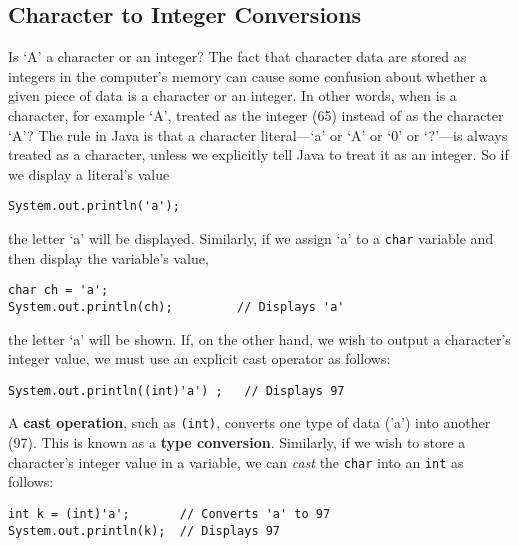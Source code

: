 \subsection{Character to Integer Conversions}

\noindent Is `A' a character or an integer?  The fact that character data are
stored as integers in the computer's memory can cause some confusion
about whether a given piece of data is a character or an integer.  In
other words, when is a character, for example `A', treated as the integer (65)
instead of as the character `A'?  The rule in Java is that a character
literal---`a' or `A' or `0' or `?'---is always treated as a
character, unless we explicitly tell Java to treat it as an
integer. So if we display a literal's value

\begin{jjjlisting}
\begin{lstlisting}
System.out.println('a');
\end{lstlisting}
\end{jjjlisting}

\noindent the letter `a' will be displayed. Similarly, if we assign `a' to a
{\tt char} variable and then display the variable's value,


\begin{jjjlisting}
\begin{lstlisting}
char ch = 'a';
System.out.println(ch);         // Displays 'a'
\end{lstlisting}
\end{jjjlisting}

\noindent the letter `a' will be shown. If, on the other hand, we wish to output a
character's integer value, we must use an explicit cast operator
as follows:

\begin{jjjlisting}
\begin{lstlisting}
System.out.println((int)'a') ;   // Displays 97
\end{lstlisting}
\end{jjjlisting}

\noindent A {\bf cast operation}, such as {\tt (int)}, 
converts one type of data ('a') into another (97). This is known as a
{\bf type conversion}. Similarly, if we wish to store a character's
integer value in a variable, we can {\it cast} the {\tt char} into an
{\tt int} as follows:

\begin{jjjlisting}
\begin{lstlisting}
int k = (int)'a';       // Converts 'a' to 97
System.out.println(k);  // Displays 97
\end{lstlisting}
\end{jjjlisting}

